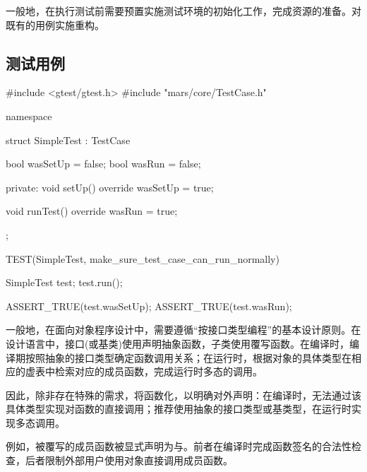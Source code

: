 \begin{content}

一般地，在执行测试前需要预置实施测试环境的初始化工作，完成资源的准备。对既有的用例实施重构。

\subsection{测试用例}

\begin{leftbar}
 \begin{c++}[caption={\ttfamily{test/mars/core/TestCaseSpec.cc}}]
#include <gtest/gtest.h>
#include "mars/core/TestCase.h"

namespace {
  struct SimpleTest : TestCase {
    bool wasSetUp = false;
    bool wasRun = false;

  private:
    void setUp() override {
      wasSetUp = true;
    }

    void runTest() override {
      wasRun = true;
    }
  };
}

TEST(SimpleTest, make_sure_test_case_can_run_normally) {
  SimpleTest test;
  test.run();

  ASSERT_TRUE(test.wasSetUp);
  ASSERT_TRUE(test.wasRun);
}
 \end{c++}
\end{leftbar}

\begin{story}
  \begin{center}
  \end{center}

\begin{content}

一般地，在面向对象程序设计中，需要遵循“按接口类型编程”的基本设计原则。在设计语言中，接口(或基类)使用声明抽象函数，子类使用覆写函数。在编译时，编译期按照抽象的接口类型确定函数调用关系；在运行时，根据对象的具体类型在相应的虚表中检索对应的成员函数，完成运行时多态的调用。

因此，除非存在特殊的需求，将函数化，以明确对外声明：在编译时，无法通过该具体类型实现对函数的直接调用；推荐使用抽象的接口类型或基类型，在运行时实现多态调用。

例如，被覆写的成员函数被显式声明为与。前者在编译时完成函数签名的合法性检查，后者限制外部用户使用对象直接调用成员函数。


\end{content}
\end{story}
\end{content}
